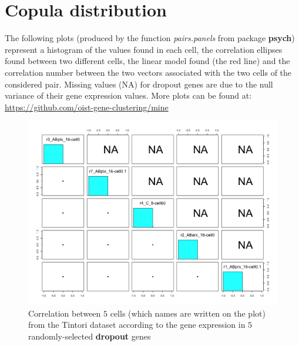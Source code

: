 \documentclass{report}
\begin{document}
{\section*{Copula distribution}

The following plots (produced by the function \textit{pairs.panels} from package \textbf{psych}) represent a histogram of the values found in each cell, the correlation ellipses found between two different cells, the linear model found (the red line) and the correlation number between the two vectors associated with the two cells of the considered pair. Missing values (NA) for dropout genes are due to the null variance of their gene expression values. More plots can be found at: {\url{https://github.com/oist-gene-clustering/mine}}\\

\begin{figure}[H]
\centering
\includegraphics[scale=0.4]{plotsCopula/tintori/depCellnGene_dropout_tintori.png}
\caption{Correlation between $5$ cells (which names are written on the plot) from the Tintori dataset according to the gene expression in $5$ randomly-selected \textbf{dropout} genes}
\label{cellcorrelationdropout}
\end{figure}

}
\end{document}
